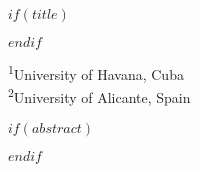$if(title)$
  \maketitle
$endif$

\begin{center}
\textsuperscript{1}University of Havana, Cuba\\
\textsuperscript{2}University of Alicante, Spain\\
\end{center}

$if(abstract)$
\begin{abstract}
$abstract$
\end{abstract}
$endif$

\newpage
